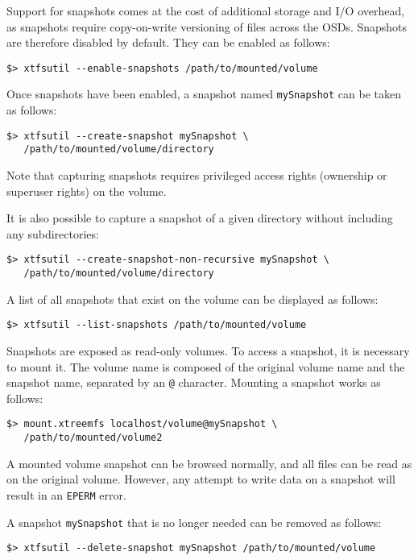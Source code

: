 \documentclass[a4paper,10pt]{book}
\begin{document}
Support for snapshots comes at the cost of additional storage and I/O overhead, as snapshots require copy-on-write versioning of files across the OSDs. Snapshots are therefore disabled by default. They can be enabled as follows:

\begin{verbatim}
$> xtfsutil --enable-snapshots /path/to/mounted/volume
\end{verbatim}

Once snapshots have been enabled, a snapshot named \texttt{mySnapshot} can be taken as follows:

\begin{verbatim}
$> xtfsutil --create-snapshot mySnapshot \
   /path/to/mounted/volume/directory
\end{verbatim}

Note that capturing snapshots requires privileged access rights (ownership or superuser rights) on the volume.

It is also possible to capture a snapshot of a given directory without including any subdirectories:

\begin{verbatim}
$> xtfsutil --create-snapshot-non-recursive mySnapshot \
   /path/to/mounted/volume/directory
\end{verbatim}

A list of all snapshots that exist on the volume can be displayed as follows:

\begin{verbatim}
$> xtfsutil --list-snapshots /path/to/mounted/volume
\end{verbatim}

Snapshots are exposed as read-only volumes. To access a snapshot, it is necessary to mount it. The volume name is composed of the original volume name and the snapshot name, separated by an \texttt{@} character. Mounting a snapshot works as follows:

\begin{verbatim}
$> mount.xtreemfs localhost/volume@mySnapshot \
   /path/to/mounted/volume2
\end{verbatim}

A mounted volume snapshot can be browsed normally, and all files can be read as on the original volume. However, any attempt to write data on a snapshot will result in an \texttt{EPERM} error.

A snapshot \texttt{mySnapshot} that is no longer needed can be removed as follows:

\begin{verbatim}
$> xtfsutil --delete-snapshot mySnapshot /path/to/mounted/volume
\end{verbatim}
\end{document}
